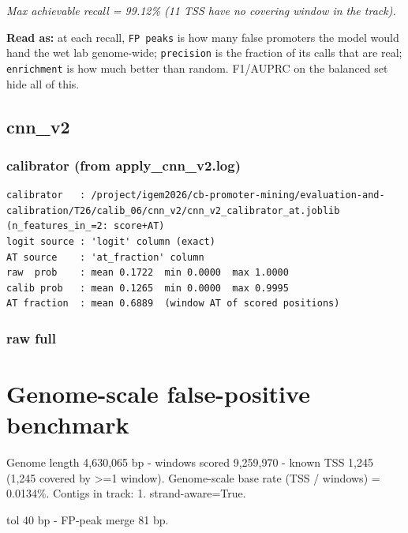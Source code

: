 \documentclass[10pt]{article}
\begin{document}
{\itshape Max achievable recall = 99.12\% (11 TSS have no covering window in the track).}

\textbf{Read as:} at each recall, \texttt{FP peaks} is how many false promoters the model would hand the wet lab genome-wide; \texttt{precision} is the fraction of its calls that are real; \texttt{enrichment} is how much better than random. F1/AUPRC on the balanced set hide all of this.

\subsection*{cnn\_v2}

\subsubsection*{calibrator (from apply\_cnn\_v2.log)}
\begin{verbatim}
calibrator   : /project/igem2026/cb-promoter-mining/evaluation-and-calibration/T26/calib_06/cnn_v2/cnn_v2_calibrator_at.joblib  (n_features_in_=2: score+AT)
logit source : 'logit' column (exact)
AT source    : 'at_fraction' column
raw  prob    : mean 0.1722  min 0.0000  max 1.0000
calib prob   : mean 0.1265  min 0.0000  max 0.9995
AT fraction  : mean 0.6889  (window AT of scored positions)
\end{verbatim}

\subsubsection*{raw \textperiodcentered{} full}
\section*{Genome-scale false-positive benchmark}

Genome length 4,630,065 bp - windows scored 9,259,970 - known TSS 1,245 (1,245 covered by >=1 window). Genome-scale base rate (TSS / windows) = 0.0134\%. Contigs in track: 1. strand-aware=True.

tol 40 bp - FP-peak merge 81 bp.

\begin{center}
\end{center}
\end{document}
